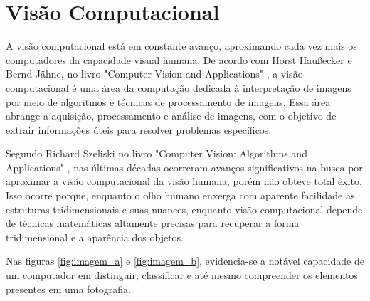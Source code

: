\section{Visão Computacional}
\label{sec:visao_comp}

A visão computacional está em constante avanço, aproximando cada vez mais os computadores da capacidade visual humana. De acordo com Horst Haußecker e Bernd Jähne, no livro "Computer Vision and Applications" \cite{comp_vision_and_applications}, a visão computacional é uma área da computação dedicada à interpretação de imagens por meio de algoritmos e técnicas de processamento de imagens. Essa área abrange a aquisição, processamento e análise de imagens, com o objetivo de extrair informações úteis para resolver problemas específicos.

Segundo Richard Szeliski no livro "Computer Vision: Algorithms and Applications" \cite{computer_vision_richard}, nas últimas décadas ocorreram avanços significativos na busca por aproximar a visão computacional da visão humana, porém não obteve total êxito. Isso ocorre porque, enquanto o olho humano enxerga com aparente facilidade as estruturas tridimensionais e suas nuances, enquanto visão computacional depende de técnicas matemáticas altamente precisas para recuperar a forma tridimensional e a aparência dos objetos.

Nas figuras \cref{fig:imagem_a} e \cref{fig:imagem_b}, evidencia-se a notável capacidade de um computador em distinguir, classificar e até mesmo compreender os elementos presentes em uma fotografia.

